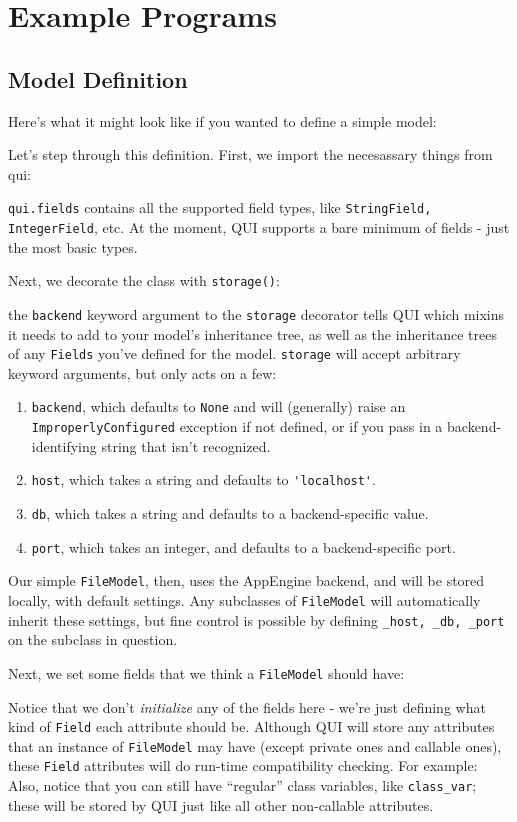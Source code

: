 \documentclass{article} %
\newcommand{\il}[1]{\lstinline{#1}}
\newcommand{\lstslice}[3]{
\begin{center}
\begin{minipage}{0.85\textwidth}

\end{minipage}
\end{center}
}
\begin{document}
\section{Example Programs}
\subsection{Model Definition}
Here's what it might look like if you wanted to define a simple model:

Let's step through this definition. First, we import the necesassary things from qui:
\lstslice{1}{3}{model_definitions.py}
\il{qui.fields} contains all the supported field types, like \il{StringField, IntegerField}, etc. At the moment, QUI supports 
a bare minimum of fields - just the most basic types.

Next, we decorate the class with \il{storage()}:

\lstslice{5}{6}{model_definitions.py}

the \il{backend} keyword argument to the \il{storage} decorator tells QUI which mixins it needs to add to your model's inheritance tree,
as well as the inheritance trees of any \il{Fields} you've defined for the model. \il{storage} will accept arbitrary keyword arguments,
but only acts on a few:
\begin{enumerate}
	\item \il{backend}, which defaults to \il{None} and will (generally) raise an \il{ImproperlyConfigured} exception if not defined, or
	if you pass in a backend-identifying string that isn't recognized.
	\item \il{host}, which takes a string and defaults to \il{'localhost'}.
	\item \il{db}, which takes a string and defaults to a backend-specific value.
	\item \il{port}, which takes an integer, and defaults to a backend-specific port.
\end{enumerate}
Our simple \il{FileModel}, then, uses the AppEngine backend, and will be stored locally, with default settings. Any subclasses of \il{FileModel}
will automatically inherit these settings, but fine control is possible by defining \il{_host, _db, _port} on the subclass in question.

Next, we set some fields that we think a \il{FileModel} should have:
\lstslice{17}{24}{model_definitions.py}
Notice that we don't \emph{initialize} any of the fields here - we're just defining what kind of \il{Field} each attribute should be.
Although QUI will store any attributes that an instance of \il{FileModel} may have (except private ones and callable ones), these
\il{Field} attributes will do run-time compatibility checking. For example:
Also, notice that you can still have ``regular'' class variables, like \il{class_var}; these will be stored by QUI just like all other non-callable
attributes.
\end{document}
